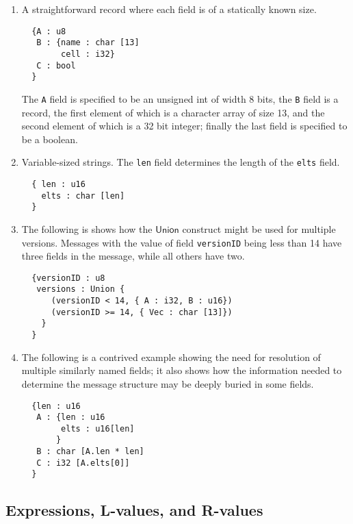 \documentclass[svgnames]{llncs}
\newcommand{\konst}[1]{\ensuremath{\mathsf{#1}}}
\begin{document}
\begin{enumerate}

\item A straightforward record where each field is of a statically known size.

\begin{verbatim}
  {A : u8
   B : {name : char [13]
        cell : i32}
   C : bool
  }
\end{verbatim}

The \verb+A+ field is specified to be an unsigned int of width 8 bits,
the \verb+B+ field is a record, the first element of which is a
character array of size 13, and the second element of which is a 32
bit integer; finally the last field is specified to be a
boolean.

\item Variable-sized strings. The \verb+len+ field determines the
 length of the \verb+elts+ field.

\begin{verbatim}
  { len : u16
    elts : char [len]
  }
\end{verbatim}


\item The following is shows how the \konst{Union} construct might be
  used for multiple versions.  Messages with the value of field
  \verb+versionID+ being less than 14 have three fields in the message,
  while all others have two.

\begin{verbatim}
  {versionID : u8
   versions : Union {
      (versionID < 14, { A : i32, B : u16})
      (versionID >= 14, { Vec : char [13]})
    }
  }
\end{verbatim}

\item The following is a contrived example showing the need for
  resolution of multiple similarly named fields; it also shows how the
  information needed to determine the message structure may be deeply
  buried in some fields.

\begin{verbatim}
  {len : u16
   A : {len : u16
        elts : u16[len]
       }
   B : char [A.len * len]
   C : i32 [A.elts[0]]
  }
\end{verbatim}

\end{enumerate}

\subsection{Expressions, L-values, and R-values}
\end{document}
